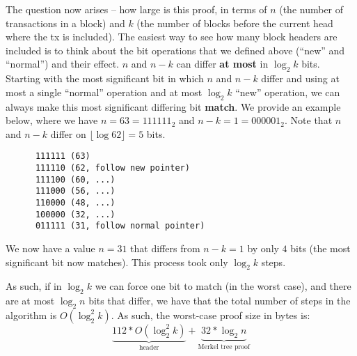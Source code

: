 \documentclass[12pt]{exam}
\begin{document}
\begin{questions}
\begin{solution}
\begin{enumerate}[label=\textbf{\alph*.}]
    The question now arises -- how large is this proof, in terms of $n$ (the number of transactions in a block) and $k$ (the number of blocks before the current head where the tx is included). The easiest way to see how many block headers are included is to think about the bit operations that we defined above (``new'' and ``normal'') and their effect. $n$ and $n - k$ can differ \textbf{at most} in $\log_2 k$ bits. Starting with the most significant bit in which $n$ and $n-k$ differ and using at most a single ``normal'' operation and at most $\log_2 k$ ``new'' operation, we can always make this most significant differing bit \textbf{match}. We provide an example below, where we have $n = 63 = 111111_2$ and $n-k = 1 = 000001_2$. Note that $n$ and $n-k$ differ on $\lfloor \log 62 \rfloor = 5$ bits.
    \begin{verbatim}
      111111 (63)
      111110 (62, follow new pointer)
      111100 (60, ...)
      111000 (56, ...)
      110000 (48, ...)
      100000 (32, ...)
      011111 (31, follow normal pointer)
    \end{verbatim}
    We now have a value $n = 31$ that differs from $n-k = 1$ by only $4$ bits (the most significant bit now matches). This process took only $\log_2 k$ steps.

    As such, if in $\log_2 k$ we can force one bit to match (in the worst case), and there are at most $\log_2 n$ bits that differ, we have that the total number of steps in the algorithm is $O(\log_2^2 k)$. As such, the worst-case proof size in bytes is:
    \[
      \underbrace{112*O(\log_2^2 k)}_{\text{header}} + \underbrace{32 * \log_2 n}_{\text{Merkel tree proof}}
    \]
\end{enumerate}
\end{solution}

\end{questions}
\end{document}
